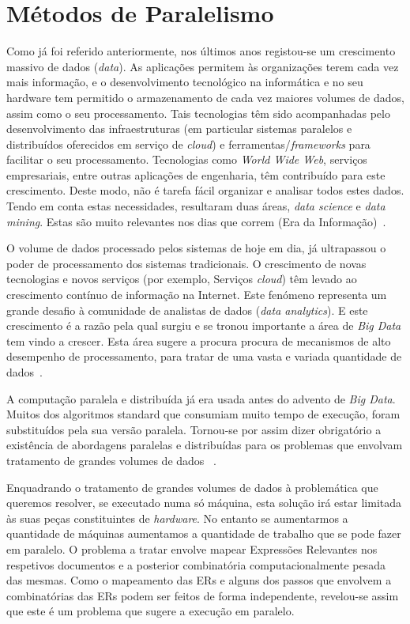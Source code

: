\section{Métodos de Paralelismo}
\label{metodos_paralelismo}
Como já foi referido anteriormente, nos últimos anos registou-se um crescimento massivo de dados (\textit{data}). As aplicações permitem às organizações terem cada vez mais informação, e o desenvolvimento tecnológico na informática e no seu hardware tem permitido o armazenamento de cada vez maiores volumes de dados, assim como o seu processamento. Tais tecnologias têm sido acompanhadas pelo desenvolvimento das infraestruturas (em particular sistemas paralelos e distribuídos oferecidos em serviço de \textit{cloud}) e ferramentas/\textit{frameworks} para facilitar o seu processamento. Tecnologias como \textit{World Wide Web}, serviços empresariais, entre outras aplicações de engenharia, têm contribuído para este crescimento. Deste modo, não é tarefa fácil organizar e analisar todos estes dados. Tendo em conta estas necessidades, resultaram duas áreas, \textit{data science} e \textit{data mining}. Estas são muito relevantes nos dias que correm (Era da Informação)~\cite{garcia2016big}.

O volume de dados processado pelos sistemas de hoje em dia, já ultrapassou o poder de processamento dos sistemas tradicionais. O crescimento de novas tecnologias e novos serviços (por exemplo, Serviços \textit{\textit{cloud}}) têm levado ao crescimento contínuo de informação na Internet. Este fenómeno representa um grande desafio à comunidade de analistas de dados (\textit{data analytics}). E este crescimento é a razão pela qual surgiu e se tronou importante a área de \textit{Big Data} tem vindo a crescer. Esta área sugere a procura procura de mecanismos de alto desempenho de processamento, para tratar de uma vasta e variada quantidade de dados~\cite{garcia2016big}.

A computação paralela e distribuída já era usada antes do advento de \textit{Big Data}. Muitos dos algoritmos standard que consumiam muito tempo de execução, foram substituídos pela sua versão paralela. Tornou-se por assim dizer obrigatório a existência de abordagens paralelas e distribuídas para os problemas que envolvam tratamento de grandes volumes de dados ~\cite{garcia2016big}.

Enquadrando o tratamento de grandes volumes de dados à problemática que queremos resolver, se executado numa só máquina, esta solução irá estar limitada às suas peças constituintes de \textit{hardware}. No entanto se aumentarmos a quantidade de máquinas aumentamos a quantidade de trabalho que se pode fazer em paralelo. O problema a tratar envolve mapear Expressões Relevantes nos respetivos documentos e a posterior combinatória computacionalmente pesada das mesmas. Como o mapeamento das ERs e alguns dos passos que envolvem a combinatórias das ERs podem ser feitos de forma independente, revelou-se assim que este é um problema que sugere a execução em paralelo.

